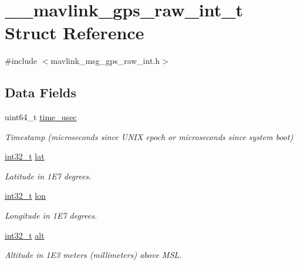 \hypertarget{struct____mavlink__gps__raw__int__t}{\section{\-\_\-\-\_\-mavlink\-\_\-gps\-\_\-raw\-\_\-int\-\_\-t Struct Reference}
\label{struct____mavlink__gps__raw__int__t}
}


{\ttfamily \#include $<$mavlink\-\_\-msg\-\_\-gps\-\_\-raw\-\_\-int.\-h$>$}

\subsection*{Data Fields}
\begin{DoxyCompactItemize}
\item 
uint64\-\_\-t \hyperlink{struct____mavlink__gps__raw__int__t_a39d30393d02f2b1882040e3fa063f6ea}{time\-\_\-usec}
\begin{DoxyCompactList}\small\item\em Timestamp (microseconds since U\-N\-I\-X epoch or microseconds since system boot) \end{DoxyCompactList}\item 
\hyperlink{group___n_a_m_e_gafd12020da5a235dfcf0c3c748fb5baed}{int32\-\_\-t} \hyperlink{struct____mavlink__gps__raw__int__t_aefd27d0b2d23c58a59b218aa151220d3}{lat}
\begin{DoxyCompactList}\small\item\em Latitude in 1\-E7 degrees. \end{DoxyCompactList}\item 
\hyperlink{group___n_a_m_e_gafd12020da5a235dfcf0c3c748fb5baed}{int32\-\_\-t} \hyperlink{struct____mavlink__gps__raw__int__t_a025fd2dd700ff7180af5a26c2a3497f4}{lon}
\begin{DoxyCompactList}\small\item\em Longitude in 1\-E7 degrees. \end{DoxyCompactList}\item 
\hyperlink{group___n_a_m_e_gafd12020da5a235dfcf0c3c748fb5baed}{int32\-\_\-t} \hyperlink{struct____mavlink__gps__raw__int__t_a00fe92144cfdaf8440a841493e5b6e99}{alt}
\begin{DoxyCompactList}\small\item\em Altitude in 1\-E3 meters (millimeters) above M\-S\-L. \end{DoxyCompactList}\item 

\end{DoxyCompactItemize}
